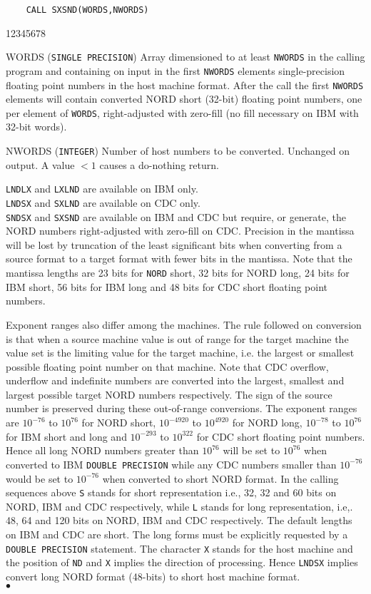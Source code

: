 \begin{verbatim}
    CALL SXSND(WORDS,NWORDS)
\end{verbatim}
\begin{DLtt}{12345678}
\item [WORDS] ({\tt SINGLE PRECISION}) Array dimensioned to at least
{\tt NWORDS} in the calling program and containing on input in the first
{\tt NWORDS} elements single-precision floating point numbers in the
host machine format. After the call the first {\tt NWORDS} elements
will contain converted NORD short (32-bit) floating point numbers,
one per element of {\tt WORDS}, right-adjusted with zero-fill
(no fill necessary on IBM with 32-bit words).
\item [NWORDS] ({\tt INTEGER}) Number of host numbers to be converted.
Unchanged on output. A value $< 1$ causes a do-nothing return.
\end{DLtt}
\Restrict
{\tt LNDLX} and {\tt LXLND} are available on IBM only. \\
{\tt LNDSX} and {\tt SXLND} are available on CDC only.\\
{\tt SNDSX} and {\tt SXSND} are available on IBM and CDC but require, or
generate, the NORD numbers right-adjusted with zero-fill on CDC.
\Accuracy
Precision in the mantissa will be lost by truncation of the least
significant bits when converting from a source format to a target format
with fewer bits in the mantissa. Note that the mantissa lengths are 23
bits for {\tt NORD} short, 32 bits for NORD long, 24 bits for IBM short,
56 bits for IBM long and 48 bits for CDC short floating point numbers.
\par
Exponent ranges also differ among the machines. The rule
followed on conversion is that when a source machine value is out of
range for the target machine the value set is the limiting value for
the target machine, i.e. the largest or smallest possible floating
point number on that machine. Note that CDC overflow, underflow and
indefinite numbers are converted into the largest, smallest and largest
possible target NORD numbers respectively. The sign of the source
number is preserved during these out-of-range conversions. The
exponent ranges are $10^{-76}$ to $10^{76}$ for NORD short, $10^{-4920}$
to
$10^{4920}$ for NORD long, $10^{-78}$ to $10^{76}$ for IBM short and long
and $10^{-293}$ to $10^{322}$ for CDC short floating point numbers.
Hence all long NORD numbers greater than $10^{76}$ will be set to
$10^{76}$ when converted to IBM {\tt DOUBLE PRECISION} while any CDC
numbers smaller than $10^{-76}$ would be set to $10^{-76}$ when
converted to short NORD format.
\newpage
\Notes
 In the calling sequences above {\tt S} stands for short
representation i.e., 32, 32 and 60 bits on NORD, IBM and CDC
respectively, while {\tt L} stands for long representation, i.e,. 48, 64
and 120 bits on NORD, IBM and CDC respectively. The default lengths
on IBM and CDC are short. The long forms must be explicitly
requested by a {\tt DOUBLE PRECISION} statement. The character {\tt X}
stands for the host machine and the position of {\tt ND} and {\tt X}
implies the direction of processing. Hence {\tt LNDSX} implies convert
long NORD format (48-bits) to short host machine format.
\\ $\bullet$

